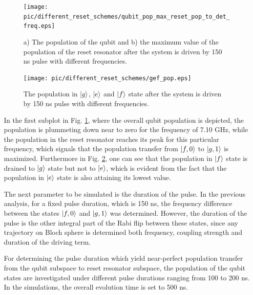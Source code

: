 \begin{figure}[h]
    \centering
    \texttt{[image: pic/different\_reset\_schemes/qubit\_pop\_max\_reset\_pop\_to\_det\_freq.eps]}
    \caption{a) The population of the qubit and b) the maximum value of the population of the reset resonator after the system is driven by 150 ns pulse with different frequencies.}
    \label{fig:freq_sweep_qubit_reset_max}
\end{figure}


\begin{figure}[h]
    \centering
    \texttt{[image: pic/different\_reset\_schemes/gef\_pop.eps]}
    \caption{The population in $\ket{g}$, $\ket{e}$ and $\ket{f}$ state after the system is driven by 150 ns pulse with different frequencies.}
    \label{fig:freq_sweep_gef}
\end{figure}


In the first subplot in Fig. \ref{fig:freq_sweep_qubit_reset_max}, where the overall qubit population is depicted, the population is plummeting down near to zero for the frequency of 7.10 GHz, while the population in the reset resonator reaches its peak for this particular frequency, which signals that the population transfer from $\ket{f,0}$ to $\ket{g,1}$ is maximized. Furthermore in Fig. \ref{fig:freq_sweep_gef}, one can see that the population in $\ket{f}$ state is drained to $\ket{g}$ state but not to $\ket{e}$, which is evident from the fact that the population in $\ket{e}$ state is also attaining its lowest value.


\vspace{2 mm}

The next parameter to be simulated is the duration of the pulse. In the previous analysis, for a fixed pulse duration, which is 150 ns, the frequency difference between the states $\ket{f,0}$ and $\ket{g,1}$ was determined. However, the duration of the pulse is the other integral part of the Rabi flip between these states, since any trajectory on Bloch sphere is determined both frequency, coupling strength and duration of the driving term.  


For determining the pulse duration which yield near-perfect population transfer from the qubit subspace to reset resonator subspace, the population of the qubit states are investigated under different pulse durations ranging from 100 to 200 ns. In the simulations, the overall evolution time is set to 500 ns.



